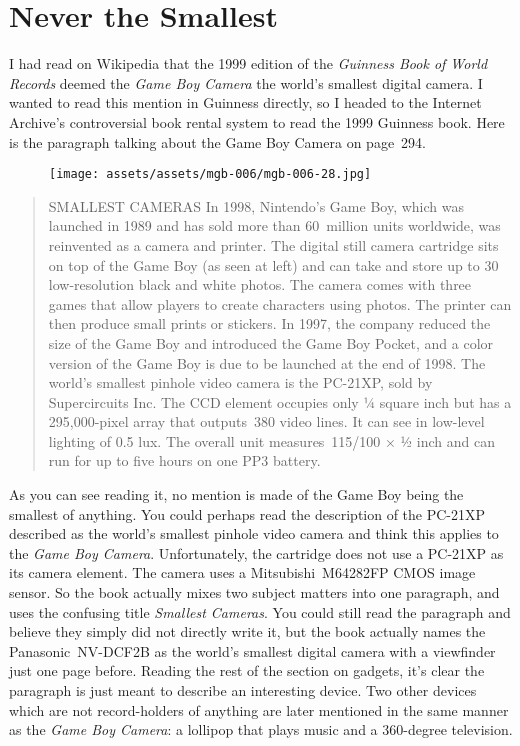 \documentclass{book}
\begin{document}
\FloatBarrier\needspace{10mm}\section*{Never the Smallest}\nopagebreak[4]

I had read on Wikipedia that the 1999 edition of the \emph{Guinness Book of World Records} deemed the \emph{Game Boy Camera} the world’s smallest digital camera. I wanted to read this mention in Guinness directly, so I headed to the Internet Archive’s controversial book rental system to read the 1999 Guinness book. Here is the paragraph talking about the Game Boy Camera on page 294.

\begin{figure}[hbt]
\vskip 10pt
\centering \texttt{[image: assets/assets/mgb-006/mgb-006-28.jpg]}
\vskip 6pt
\end{figure}

\begin{quote}
SMALLEST CAMERAS In 1998, Nintendo’s Game Boy, which was launched in 1989 and has sold more than 60 million units worldwide, was reinvented as a camera and printer. The digital still camera cartridge sits on top of the Game Boy (as seen at left) and can take and store up to 30 low-resolution black and white photos. The camera comes with three games that allow players to create characters using photos. The printer can then produce small prints or stickers. In 1997, the company reduced the size of the Game Boy and introduced the Game Boy Pocket, and a color version of the Game Boy is due to be launched at the end of 1998. The world’s smallest pinhole video camera is the PC-21XP, sold by Supercircuits Inc. The CCD element occupies only ¼ square inch but has a 295,000-pixel array that outputs 380 video lines. It can see in low-level lighting of 0.5 lux. The overall unit measures 115/100 × ½ inch and can run for up to five hours on one PP3 battery.
\end{quote} \par

As you can see reading it, no mention is made of the Game Boy being the smallest of anything. You could perhaps read the description of the PC-21XP described as the world’s smallest pinhole video camera and think this applies to the \emph{Game Boy Camera}. Unfortunately, the cartridge does not use a PC-21XP as its camera element. The camera uses a Mitsubishi M64282FP CMOS image sensor. So the book actually mixes two subject matters into one paragraph, and uses the confusing title \emph{Smallest Cameras}. You could still read the paragraph and believe they simply did not directly write it, but the book actually names the Panasonic NV-DCF2B as the world’s smallest digital camera with a viewfinder just one page before. Reading the rest of the section on gadgets, it’s clear the paragraph is just meant to describe an interesting device. Two other devices which are not record-holders of anything are later mentioned in the same manner as the \emph{Game Boy Camera}: a lollipop that plays music and a 360-degree television.
\end{document}
